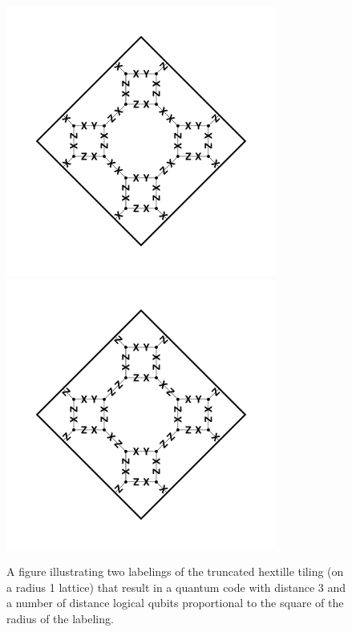 \documentclass{amsbook}
\theoremstyle{plain}
\theoremstyle{definition}
\theoremstyle{remark}
\begin{document}
\begin{figure}
\includegraphics[width=3.5in]{images/truncated-quadrille-code-3-labeling-1} %
\includegraphics[width=3.5in]{images/truncated-quadrille-code-3-labeling-2} %
\caption{
\label{figure:truncated-hextille-code-3-labelings}
A figure illustrating two labelings of the truncated hextille tiling (on a radius 1 lattice) that result in a quantum code with distance 3 and a number of distance logical qubits proportional to the square of the radius of the labeling.
}
\end{figure}
\end{document}
